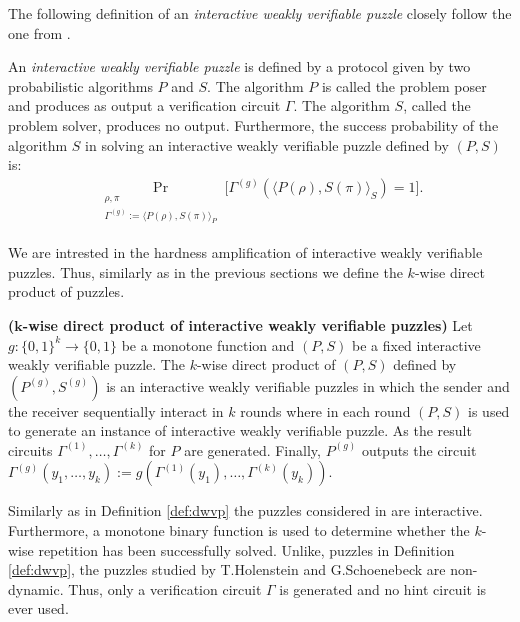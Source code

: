 The following definition of an \textit{interactive weakly verifiable puzzle} closely follow the one from \cite{DBLP:journals/corr/abs-1002-3534}.
\begin{definition}
An \textit{interactive weakly verifiable puzzle} is defined by a protocol given by two probabilistic algorithms $P$ and $S$.
The algorithm $P$ is called the problem poser and produces as output a verification circuit $\Gamma$.
The algorithm $S$, called the problem solver, produces no output.
Furthermore, the \textnormal{success probability} of the algorithm $S$ in solving an interactive weakly verifiable puzzle defined by $(P,S)$ is:
\begin{align*}
  \underset{\substack{\rho, \pi \\ \Gamma^{(g)} := \langle P(\rho), S(\pi) \rangle_{P}}}{\Pr}\Big[\Gamma^{(g)}(\langle P(\rho),S(\pi) \rangle_{S}) = 1 \Big].
\end{align*}
\end{definition}
We are intrested in the hardness amplification of interactive weakly verifiable puzzles. Thus, similarly as in the previous sections
we define the $k$-wise direct product of puzzles.
\begin{definition}\textbf{($\boldsymbol{k}$-wise direct product of interactive weakly verifiable puzzles)}
Let $g: \{0,1\}^{k} \rightarrow \{0,1\}$ be a monotone function and $(P,S)$ be a fixed interactive weakly verifiable puzzle.
The $k$-wise direct product of $(P,S)$ defined by $(P^{(g)}, S^{(g)})$ is an interactive weakly verifiable puzzles in which the sender and the receiver
sequentially interact in $k$ rounds where in each round $(P,S)$ is used to generate an instance of interactive weakly verifiable puzzle.
As the result circuits $\Gamma^{(1)}, \dotsc, \Gamma^{(k)}$ for $P$ are generated.
Finally, $P^{(g)}$ outputs the circuit $\Gamma^{(g)}(y_1, \dotsc, y_k) := g(\Gamma^{(1)}(y_1), \dotsc, \Gamma^{(k)}(y_k))$.
\end{definition}

Similarly as in Definition \ref{def:dwvp} the puzzles considered in \cite{DBLP:journals/corr/abs-1002-3534} are interactive.
Furthermore, a monotone binary function is used to determine whether the $k$-wise repetition
has been successfully solved. Unlike, puzzles in Definition \ref{def:dwvp}, the puzzles studied by T.Holenstein and G.Schoenebeck
are non-dynamic. Thus, only a verification circuit $\Gamma$ is generated and no hint circuit is ever used.

